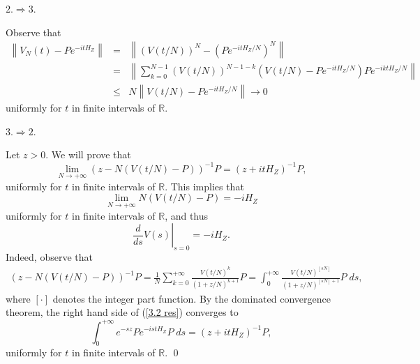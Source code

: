 \documentclass[aip,jmp,12pt
]{revtex4}
\newcommand{\RM}{\mathbb{R}}
\theoremstyle{definition}
\begin{document}
$2. \Rightarrow 3.$

Observe that
\begin{eqnarray*}
\left\|V_{N}(t)-Pe^{-itH_{Z}}\right\| & = & \left\|\left(V(t/N)\right)^N-(Pe^{-itH_{Z}/N})^N\right\| \\
                                      & = & \left\| \sum_{k=0}^{N-1} (V(t/N))^{N-1-k} (V(t/N)-Pe^{-itH_{Z}/N})Pe^{-iktH_{Z}/N} \right\| \\
                                      & \leq & N \left\|V(t/N)-Pe^{-itH_{Z}/N}\right\| \to 0
\end{eqnarray*}
uniformly for $t$ in finite intervals of $\RM$.

$3. \Rightarrow 2.$

Let $z>0$. We will prove that
$$
\lim_{N \to +\infty}\left( z-N \left(V(t/N)-P\right)\right)^{-1}P =(z+itH_{Z})^{-1}P,
$$
uniformly for $t$ in finite intervals of $\RM$. This implies that
$$
\lim_{N \to +\infty} N(V(t/N)-P) = -iH_{Z}
$$
uniformly for $t$ in finite intervals of $\RM$, and thus
$$
\left.\frac{d}{ds}V(s)\right|_{s=0}=-iH_{Z}.
$$
Indeed, observe that
\begin{eqnarray}\label{3.2 res}
\left( z-N\left(V(t/N)-P\right)\right)^{-1}P  =  \frac{1}{N}\sum_{k=0}^{+\infty}\frac{V(t/N)^k}{(1+z/N)^{k+1}}P  =  \int_{0}^{+\infty}\frac{V(t/N)^{[sN]}}{(1+z/N)^{[sN]+1}} P \; ds ,
\end{eqnarray}
where $[\cdot]$ denotes the integer part function.
By the dominated convergence theorem, the right hand side of (\ref{3.2 res}) converges to
$$
\int_{0}^{+\infty} e^{-sz} Pe^{-istH_{Z}}P \;  ds = (z+itH_{Z})^{-1}P,
$$
uniformly for $t$ in finite intervals of $\RM$.
\qed
\end{document}
